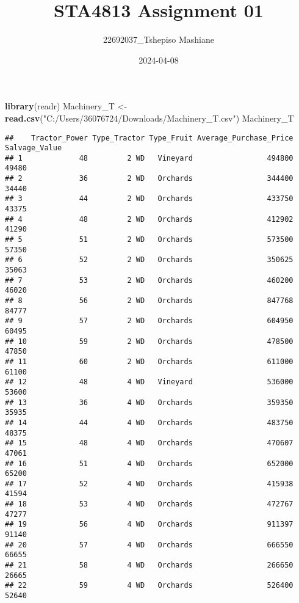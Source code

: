 \documentclass[
]{article}
\title{STA4813 Assignment 01}
\author{22692037\_Tshepiso Mashiane}
\date{2024-04-08}
\newenvironment{Shaded}{\begin{snugshade}}{\end{snugshade}}
\newcommand{\FunctionTok}[1]{\textcolor[rgb]{0.13,0.29,0.53}{\textbf{#1}}}
\newcommand{\NormalTok}[1]{#1}
\newcommand{\OtherTok}[1]{\textcolor[rgb]{0.56,0.35,0.01}{#1}}
\newcommand{\StringTok}[1]{\textcolor[rgb]{0.31,0.60,0.02}{#1}}
\begin{document}
\maketitle

\begin{Shaded}
\begin{Highlighting}[]
\FunctionTok{library}\NormalTok{(readr)}
\NormalTok{Machinery\_T }\OtherTok{\textless{}{-}} \FunctionTok{read.csv}\NormalTok{(}\StringTok{"C:/Users/36076724/Downloads/Machinery\_T.csv"}\NormalTok{)}
\NormalTok{Machinery\_T}
\end{Highlighting}
\end{Shaded}

\begin{verbatim}
##    Tractor_Power Type_Tractor Type_Fruit Average_Purchase_Price Salvage_Value
## 1             48         2 WD   Vineyard                 494800         49480
## 2             36         2 WD   Orchards                 344400         34440
## 3             44         2 WD   Orchards                 433750         43375
## 4             48         2 WD   Orchards                 412902         41290
## 5             51         2 WD   Orchards                 573500         57350
## 6             52         2 WD   Orchards                 350625         35063
## 7             53         2 WD   Orchards                 460200         46020
## 8             56         2 WD   Orchards                 847768         84777
## 9             57         2 WD   Orchards                 604950         60495
## 10            59         2 WD   Orchards                 478500         47850
## 11            60         2 WD   Orchards                 611000         61100
## 12            48         4 WD   Vineyard                 536000         53600
## 13            36         4 WD   Orchards                 359350         35935
## 14            44         4 WD   Orchards                 483750         48375
## 15            48         4 WD   Orchards                 470607         47061
## 16            51         4 WD   Orchards                 652000         65200
## 17            52         4 WD   Orchards                 415938         41594
## 18            53         4 WD   Orchards                 472767         47277
## 19            56         4 WD   Orchards                 911397         91140
## 20            57         4 WD   Orchards                 666550         66655
## 21            58         4 WD   Orchards                 266650         26665
## 22            59         4 WD   Orchards                 526400         52640

\end{verbatim}
\end{document}
